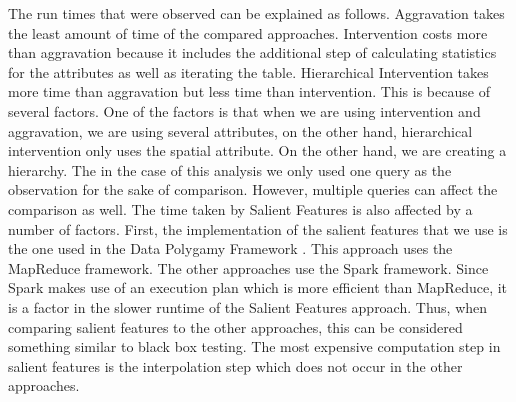The run times that were observed can be explained as follows. Aggravation takes the least amount of time of the compared approaches. Intervention costs more than aggravation because it includes the additional step of calculating statistics for the attributes as well as iterating the table. Hierarchical Intervention takes more time than aggravation but less time than intervention. This is because of several factors. One of the factors is that when we are using intervention and aggravation, we are using several attributes, on the other hand, hierarchical intervention only uses the spatial attribute. On the other hand, we are creating a hierarchy. The in the case of this analysis we only used one query as the observation for the sake of comparison. However, multiple queries can affect the comparison as well. The time taken by Salient Features is also affected by a number of factors. First, the implementation of the salient features that we use is the one used in the Data Polygamy Framework \cite{chirigati2016data}. This approach uses the MapReduce framework. The other approaches use the Spark framework. Since Spark makes use of an execution plan which is more efficient than MapReduce, it is a factor in the slower runtime of the Salient Features approach. Thus, when comparing salient features to the other approaches, this can be considered something similar to black box testing. The most expensive computation step in salient features is the interpolation step which does not occur in the other approaches.


